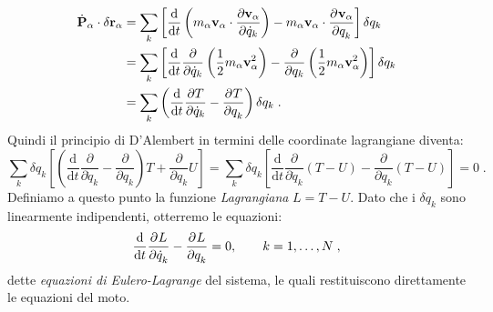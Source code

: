 \begin{align}
\dot{\mathbf{P}}_{\alpha}\cdot \delta\mathbf{r}_{\alpha} &= \sum_k\left[\frac{\mathrm{d}}{\mathrm{d}{t}}\left(m_{\alpha}\mathbf{v}_{\alpha}\cdot \frac{\partial \mathbf{v}_{\alpha}}{\partial \dot{q}_k}\right)-m_{\alpha}\mathbf{v}_{\alpha}\cdot\frac{\partial^{}\mathbf{v}_{\alpha}}{\partial q_k^{}}\right]\delta q_k  \notag \\
&=\sum_k \left[\frac{\mathrm{d}}{\mathrm{d}{t}}\frac{\partial}{\partial \dot{q}_k}\left(\frac{1}{2}m_{\alpha}\mathbf{v}_{\alpha}^2\right)-\frac{\partial}{\partial q_k}\left(\frac{1}{2}m_{\alpha}\mathbf{v}_{\alpha}^2\right)\right]\delta q_k \notag \\
&= \sum_k\left(\frac{\mathrm{d}}{\mathrm{d}{t}}\frac{\partial T}{\partial \dot{q}_k}-\frac{\partial^{}T}{\partial q_k^{}}\right)\delta q_k\;.
\end{align}
Quindi il principio di D'Alembert in termini delle coordinate lagrangiane diventa:
\begin{equation}
\sum_k\delta q_k \left[\left(\frac{\mathrm{d}}{\mathrm{d}t}\frac{\partial}{\partial \dot{q}_k}- \frac{\partial}{\partial q_k}\right)T+\frac{\partial}{\partial q_k}U\right]=\sum_k\delta q_k\left[\frac{\mathrm{d}}{\mathrm{d}t}\frac{\partial}{\partial \dot{q}_k}(T-U)-\frac{\partial}{\partial q_k}(T-U)\right]=0\;.
\end{equation}
Definiamo a questo punto la funzione \textit{Lagrangiana} $L=T-U$. Dato che i $\delta q_k$ sono linearmente indipendenti, otterremo le equazioni:
\begin{equation}
\frac{\mathrm{d}}{\mathrm{d}{t}}\frac{\partial^{}L}{\partial \dot{q}_k^{}}-\frac{\partial^{}L}{\partial q_k^{}}=0,\qquad k=1,\ldots, N\;,
\end{equation}
dette \emph{equazioni di Eulero-Lagrange} del sistema, le quali restituiscono direttamente le equazioni del moto.
